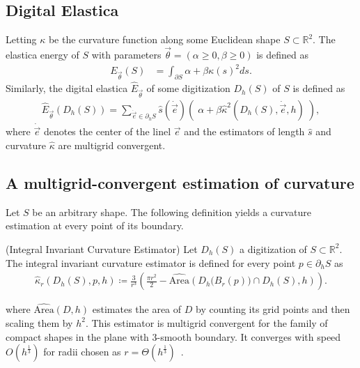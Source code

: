 \documentclass[runningheads]{llncs}
\begin{document}
\subsection{Digital Elastica}
Letting $\kappa$ be the curvature function along some Euclidean shape
$S \subset \mathbb{R}^2$. The elastica energy of $S$ with parameters
$\vec{\theta}=(\alpha \geq 0, \beta \geq 0)$ is defined as
	\begin{align*}
	E_{\vec{\theta}}(S) &= \int_{\partial S}{ \alpha + \beta \kappa(s)^2 ds}.
	\end{align*}
Similarly, the digital elastica $\hat{E}_{\vec{\theta}}$ of some digitization $D_h(S)$ of $S$ is defined as
	\begin{align}
	\hat{E}_{\vec{\theta}}( D_h(S) ) = \sum_{\dot{\vec{e}} \in \partial_h S}{ \hat{s}( \dot{\vec{e}})\left(\; \alpha + \beta \hat{\kappa}^2(D_h(S),\dot{\vec{e}},h) \; \right)},
	\label{ch5:digital-elastica}
	\end{align}
where $\dot{\vec{e}}$ denotes the center of the linel $\vec{e}$ and the estimators of length $\hat{s}$ and
curvature $\hat{\kappa}$ are multigrid convergent.


\subsection{A multigrid-convergent estimation of curvature}    
Let $S$ be an arbitrary shape. The following definition yields a curvature estimation at every point of its boundary.

\begin{definition}{(Integral Invariant Curvature Estimator)}
  Let $D_h(S)$ a digitization of $S \subset \mathbb{R}^2$. The integral invariant curvature estimator is defined for
  every point $p \in \partial_h S$ as
  \begin{align}
    \hat{\kappa}_{r}(D_h(S),p,h) \coloneqq \frac{3}{r^3} \left( \frac{\pi r^2}{2} - \widehat{\text{Area}} \left( D_h\big( B_{r} ( p ) \big) \cap D_h(S), h \right) \right).
    \label{eq:curvature_approximation}
  \end{align}
\end{definition}
%
where $\widehat{\text{Area}}( D,h )$ estimates the area of $D$ by counting its grid points and then scaling them by
$h^2$. This estimator is multigrid convergent for the family of compact shapes in the plane with $3$-smooth boundary. It
converges with speed $O(h^\frac{1}{3})$ for radii chosen as $r=\Theta(h^\frac{1}{3})$~\cite{lachaud17robust}.
\end{document}
